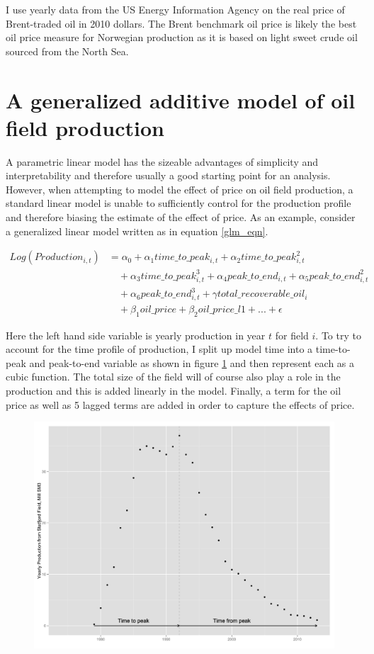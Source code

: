 \documentclass[12pt]{scrartcl} %
\begin{document}
I use yearly data from the US Energy Information Agency on the real price of Brent-traded oil in 2010 dollars.  The Brent benchmark oil price is likely the best oil price measure for Norwegian production as it is based on light sweet crude oil sourced from the North Sea.   

\section{A generalized additive model of oil field production}
A parametric linear model has the sizeable advantages of simplicity and interpretability and therefore usually a good starting point for an analysis.  However, when attempting to model the effect of price on oil field production, a standard linear model is unable to sufficiently control for the production profile and therefore biasing the estimate of the effect of price.  As an example, consider a generalized linear model written as in equation \ref{glm_eqn}. 

	\begin{equation}
	\begin{split}
	 Log(Production_{i,t}) & = \alpha_0 + \alpha_1 time\_to\_peak_{i,t} + \alpha_2 time\_to\_peak_{i,t}^2 \\
	& \quad + \alpha_3 time\_to\_peak_{i,t}^3  + \alpha_4 peak\_to\_end_{i,t} + \alpha_5 peak\_to\_end_{i,t}^2 \\
	& \quad + \alpha_6 peak\_to\_end_{i,t}^3 + \gamma total\_recoverable\_oil_i \\
	& \quad + \beta_1 oil\_price + \beta_2 oil\_price\_l1 + ...+ \epsilon
	\end{split}
\label{glm_eqn}
	\end{equation}

Here the left hand side variable is yearly production in year $t$ for field $i$.  To try to account for the time profile of production, I split up model time into a time-to-peak and peak-to-end variable as shown in figure \ref{statfjord_dem} and then represent each as a cubic function.  The total size of the field will of course also play a role in the production and this is added linearly in the model.  Finally, a term for the oil price as well as 5 lagged terms are added in order to capture the effects of price.  

\begin{figure}
\includegraphics[width=.8\textwidth]{statfjord_dem.png}
\caption{}
\label{statfjord_dem}
\end{figure}
\end{document}
